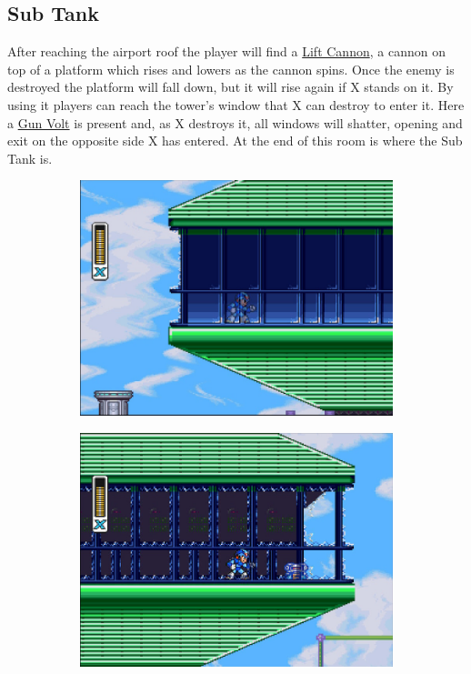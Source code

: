 \subsection{Sub Tank}
After reaching the airport roof the player will find a 	\hyperlink{enem:Lift_Cannon}{Lift Cannon}, a cannon on top of a platform which rises and lowers as the cannon spins. Once the enemy is destroyed the platform will fall down, but it will rise again if X stands on it. By using it players can reach the tower's window that X can destroy to enter it. Here a \hyperlink{enem:Gun_Volt}{Gun Volt} is present and, as X destroys it, all windows will shatter, opening and exit on the opposite side X has entered. At the end of this room is where the Sub Tank is. 

\begin{figure}[htp]
	\centering
	\begin{subfigure}{0.4\linewidth}
		\centering
		\includegraphics[width=\linewidth]{figures/X1/Storm_eagle/Storm_tank_1.jpg}
		\caption{}
	\end{subfigure}
	\begin{subfigure}{0.4\linewidth}
		\centering
		\includegraphics[width=\linewidth]{figures/X1/Storm_eagle/Storm_tank_2.jpg}

\end{subfigure}
\end{figure}
